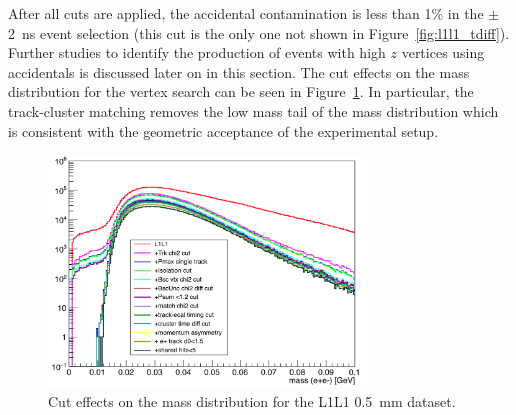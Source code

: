 After all cuts are applied, the accidental contamination is less than 1$\%$ in the $\pm$ 2~ns event selection (this cut is the only one not shown in Figure~\ref{fig:l1l1_tdiff}). Further studies to identify the production of events with high $z$ vertices using accidentals is discussed later on in this section. The cut effects on the mass distribution for the vertex search can be seen in Figure~\ref{fig:l1l1_mass}. In particular, the track-cluster matching removes the low mass tail of the mass distribution which is consistent with the geometric acceptance of the experimental setup.

\begin{figure}[htb]
  \centering
      \includegraphics[width=0.75\textwidth]{pics/searching/mass_L1L1_cuts.png}
  \caption[Cut effects on the mass distribution]{Cut effects on the mass distribution for the L1L1 0.5~mm dataset.}
  \label{fig:l1l1_mass}
\end{figure} 

